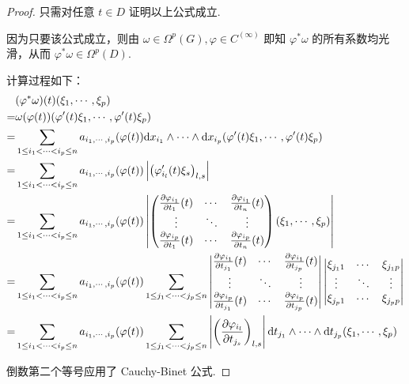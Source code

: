 \begin{proof}
    只需对任意 $t\in D$ 证明以上公式成立.
    
    因为只要该公式成立，则由 $\omega\in\Omega^p(G),\varphi\in C^{(\infty)}$ 即知 $\varphi^*\omega$ 的所有系数均光滑，从而 $\varphi^*\omega\in\Omega^p(D)$.

    计算过程如下：
$$
\begin{aligned}
&(\varphi^*\omega)(t)(\xi_1,\cdots,\xi_p)\\
=&\omega(\varphi(t))(\varphi'(t)\xi_1,\cdots,\varphi'(t)\xi_p)\\
=&\sum_{1\le i_1<\cdots<i_p\le n}a_{i_1,\cdots,i_p}(\varphi(t))\mathrm{d} x_{i_1}\wedge\cdots\wedge\mathrm{d} x_{i_p}(\varphi'(t)\xi_1,\cdots,\varphi'(t)\xi_p)\\
=&\sum_{1\le i_1<\cdots<i_p\le n}a_{i_1,\cdots,i_p}(\varphi(t))\left\lvert\left(\varphi_{i_l}'(t)\xi_s\right)_{l,s}\right\rvert\\
=&\sum_{1\le i_1<\cdots<i_p\le n}a_{i_1,\cdots,i_p}(\varphi(t))\left\lvert\begin{pmatrix}\frac{\partial{\varphi_{i_1}}}{\partial{t_1}}(t) & \cdots & \frac{\partial{\varphi_{i_1}}}{\partial{t_n}}(t)\\\vdots & \ddots & \vdots\\\frac{\partial{\varphi_{i_p}}}{\partial{t_1}}(t) & \cdots & \frac{\partial{\varphi_{i_p}}}{\partial{t_n}}(t)\end{pmatrix}(\xi_1,\cdots,\xi_p)\right\rvert\\
=&\sum_{1\le i_1<\cdots<i_p\le n}a_{i_1,\cdots,i_p}(\varphi(t))\sum_{1\le j_1<\cdots<j_p\le n}\begin{vmatrix}\frac{\partial{\varphi_{i_1}}}{\partial{t_{j_1}}}(t) & \cdots & \frac{\partial{\varphi_{i_1}}}{\partial{t_{j_p}}}(t)\\\vdots & \ddots & \vdots\\\frac{\partial{\varphi_{i_p}}}{\partial{t_{j_1}}}(t) & \cdots & \frac{\partial{\varphi_{i_p}}}{\partial{t_{j_p}}}(t)\end{vmatrix}\begin{vmatrix}\xi_{j_11} & \cdots & \xi_{j_1p}\\\vdots & \ddots & \vdots\\\xi_{j_p1} & \cdots & \xi_{j_pp}\end{vmatrix}\\
=&\sum_{1\le i_1<\cdots<i_p\le n}a_{i_1,\cdots,i_p}(\varphi(t))\sum_{1\le j_1<\cdots<j_p\le n}\left\lvert\left(\frac{\partial{\varphi_{i_l}}}{\partial{t_{j_s}}}\right)_{l,s}\right\rvert\mathrm{d} t_{j_1}\wedge\cdots\wedge\mathrm{d} t_{j_p}(\xi_1,\cdots,\xi_p)\\
\end{aligned}
$$

    倒数第二个等号应用了 Cauchy-Binet 公式.
\end{proof}

